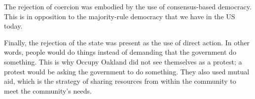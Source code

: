 The rejection of coercion was embodied by the use of consensus-based democracy.
This is in opposition to the majority-rule democracy that we have in the US today.
 
Finally, the rejection of the state was present as the use of direct action.
In other words, people would do things instead of demanding that the government do something.
This is why Occupy Oakland did not see themselves as a protest; a protest would be asking the government to do something.
They also used mutual aid, which is the strategy of sharing resources from within the community to meet the community's needs.